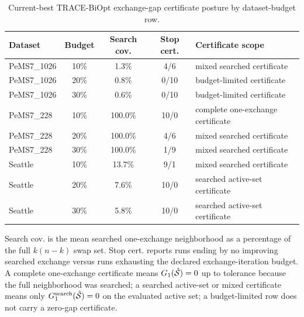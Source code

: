 \begin{table}[pos=htbp]
\centering
\caption{Current-best TRACE-BiOpt exchange-gap certificate posture by dataset-budget row.}
\label{tab:trace-biopt-exchange-certificate}
\footnotesize
\begin{tabular}{lcccl}
\toprule
Dataset & Budget & Search cov. & Stop cert. & Certificate scope \\
\midrule
PeMS7\_1026 & 10\% & 1.3\% & 4/6 & mixed searched certificate \\
PeMS7\_1026 & 20\% & 0.8\% & 0/10 & budget-limited certificate \\
PeMS7\_1026 & 30\% & 0.6\% & 0/10 & budget-limited certificate \\
PeMS7\_228 & 10\% & 100.0\% & 10/0 & complete one-exchange certificate \\
PeMS7\_228 & 20\% & 100.0\% & 4/6 & mixed searched certificate \\
PeMS7\_228 & 30\% & 100.0\% & 1/9 & mixed searched certificate \\
Seattle & 10\% & 13.7\% & 9/1 & mixed searched certificate \\
Seattle & 20\% & 7.6\% & 10/0 & searched active-set certificate \\
Seattle & 30\% & 5.8\% & 10/0 & searched active-set certificate \\
\bottomrule
\end{tabular}
\begin{flushleft}\footnotesize Search cov. is the mean searched one-exchange neighborhood as a percentage of the full $k(n-k)$ swap set. Stop cert. reports runs ending by no improving searched exchange versus runs exhausting the declared exchange-iteration budget. A complete one-exchange certificate means $G_1(\hat{\mathcal{S}})=0$ up to tolerance because the full neighborhood was searched; a searched active-set or mixed certificate means only $G^{\mathrm{search}}_1(\hat{\mathcal{S}})=0$ on the evaluated active set; a budget-limited row does not carry a zero-gap certificate.\end{flushleft}
\end{table}
